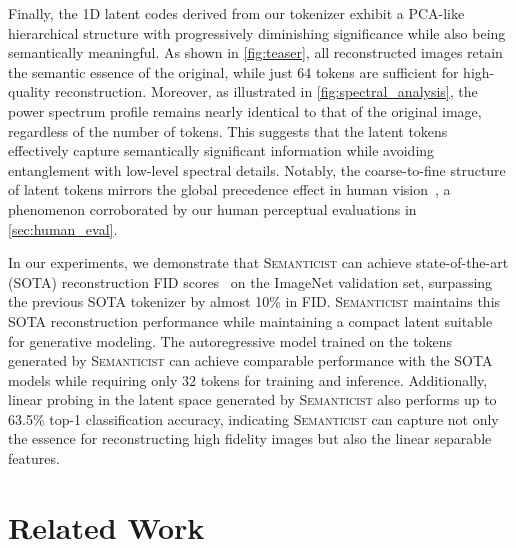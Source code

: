 \documentclass[10pt,twocolumn,letterpaper]{article}
\DeclareRobustCommand{\modelname}{\textsc{Semanticist}\xspace}
\begin{document}
Finally, the 1D latent codes derived from our tokenizer exhibit a PCA-like hierarchical structure with progressively diminishing significance while also being semantically meaningful.
As shown in \cref{fig:teaser}, all reconstructed images retain the semantic essence of the original, while just 64 tokens are sufficient for high-quality reconstruction. Moreover, as illustrated in \cref{fig:spectral_analysis}, the power spectrum profile remains nearly identical to that of the original image, regardless of the number of tokens. This suggests that the latent tokens effectively capture semantically significant information while avoiding entanglement with low-level spectral details.
Notably, the coarse-to-fine structure of latent tokens mirrors the global precedence effect in human vision~\cite{NAVON1977353,fei2007we}, a phenomenon corroborated by our human perceptual evaluations in \cref{sec:human_eval}.



In our experiments, we demonstrate that \modelname can achieve state-of-the-art (SOTA) reconstruction FID scores~\cite{fid} on the ImageNet validation set, surpassing the previous SOTA tokenizer by almost 10\% in FID.
\modelname maintains this SOTA reconstruction performance while maintaining a compact latent suitable for generative modeling.
The autoregressive model trained on the tokens generated by \modelname can achieve comparable performance with the SOTA models while requiring only 32 tokens for training and inference.
Additionally, linear probing in the latent space generated by \modelname also performs up to 63.5\% top-1 classification accuracy, indicating \modelname can capture not only the essence for reconstructing high fidelity images but also the linear separable features.














\section{Related Work}
\end{document}
